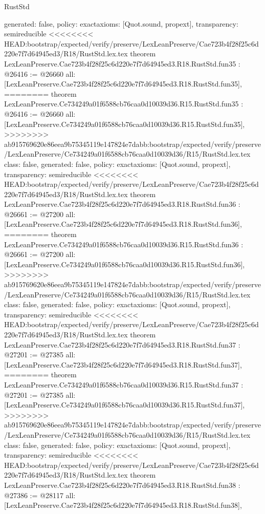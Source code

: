 \begin{lexlean}{RustStd}
\begin{coremodule}
{\begin{coremodule}
{{{{{{{{{{{{{{{{{{{{{{{{{{{{{{{{{{{{{{  generated: false,
  policy: exact{axioms: [Quot.sound, propext]},
  transparency: semireducible
}
<<<<<<<< HEAD:bootstrap/expected/verify/preserve/LexLeanPreserve/Cae723b4f28f25c6d220e7f7d64945ed3/R18/RustStd.lex.tex
theorem LexLeanPreserve.Cae723b4f28f25c6d220e7f7d64945ed3.R18.RustStd.fun35 : @26416 := @26660 {
  all: [LexLeanPreserve.Cae723b4f28f25c6d220e7f7d64945ed3.R18.RustStd.fun35],
========
theorem LexLeanPreserve.Ce734249a01f6588cb76caa0d10039d36.R15.RustStd.fun35 : @26416 := @26660 {
  all: [LexLeanPreserve.Ce734249a01f6588cb76caa0d10039d36.R15.RustStd.fun35],
>>>>>>>> ab915769620e86eea9b75345119e147824e7dabb:bootstrap/expected/verify/preserve/LexLeanPreserve/Ce734249a01f6588cb76caa0d10039d36/R15/RustStd.lex.tex
  class: false,
  generated: false,
  policy: exact{axioms: [Quot.sound, propext]},
  transparency: semireducible
}
<<<<<<<< HEAD:bootstrap/expected/verify/preserve/LexLeanPreserve/Cae723b4f28f25c6d220e7f7d64945ed3/R18/RustStd.lex.tex
theorem LexLeanPreserve.Cae723b4f28f25c6d220e7f7d64945ed3.R18.RustStd.fun36 : @26661 := @27200 {
  all: [LexLeanPreserve.Cae723b4f28f25c6d220e7f7d64945ed3.R18.RustStd.fun36],
========
theorem LexLeanPreserve.Ce734249a01f6588cb76caa0d10039d36.R15.RustStd.fun36 : @26661 := @27200 {
  all: [LexLeanPreserve.Ce734249a01f6588cb76caa0d10039d36.R15.RustStd.fun36],
>>>>>>>> ab915769620e86eea9b75345119e147824e7dabb:bootstrap/expected/verify/preserve/LexLeanPreserve/Ce734249a01f6588cb76caa0d10039d36/R15/RustStd.lex.tex
  class: false,
  generated: false,
  policy: exact{axioms: [Quot.sound, propext]},
  transparency: semireducible
}
<<<<<<<< HEAD:bootstrap/expected/verify/preserve/LexLeanPreserve/Cae723b4f28f25c6d220e7f7d64945ed3/R18/RustStd.lex.tex
theorem LexLeanPreserve.Cae723b4f28f25c6d220e7f7d64945ed3.R18.RustStd.fun37 : @27201 := @27385 {
  all: [LexLeanPreserve.Cae723b4f28f25c6d220e7f7d64945ed3.R18.RustStd.fun37],
========
theorem LexLeanPreserve.Ce734249a01f6588cb76caa0d10039d36.R15.RustStd.fun37 : @27201 := @27385 {
  all: [LexLeanPreserve.Ce734249a01f6588cb76caa0d10039d36.R15.RustStd.fun37],
>>>>>>>> ab915769620e86eea9b75345119e147824e7dabb:bootstrap/expected/verify/preserve/LexLeanPreserve/Ce734249a01f6588cb76caa0d10039d36/R15/RustStd.lex.tex
  class: false,
  generated: false,
  policy: exact{axioms: [Quot.sound, propext]},
  transparency: semireducible
}
<<<<<<<< HEAD:bootstrap/expected/verify/preserve/LexLeanPreserve/Cae723b4f28f25c6d220e7f7d64945ed3/R18/RustStd.lex.tex
theorem LexLeanPreserve.Cae723b4f28f25c6d220e7f7d64945ed3.R18.RustStd.fun38 : @27386 := @28117 {
  all: [LexLeanPreserve.Cae723b4f28f25c6d220e7f7d64945ed3.R18.RustStd.fun38],
}}}}}}}}}}}}}}}}}}}}}}}}}}}}}}}}}}}}}}}}}
\end{coremodule}}
\end{coremodule}
\end{lexlean}
